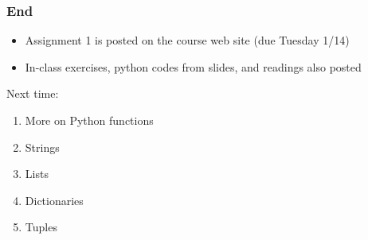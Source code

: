\documentclass{beamer}
\begin{document}
\begin{frame}
\frametitle{End}
\begin{itemize}
\setlength{\itemsep}{0.05in}
\item{Assignment 1 is posted on the course web site (due Tuesday 1/14)}
\item{In-class exercises, python codes from slides, and readings also posted}
\end{itemize}

Next time:
\begin{enumerate}
\setlength{\itemsep}{0.05in}
\item{More on Python functions}
\item{Strings}
\item{Lists}
\item{Dictionaries}
\item{Tuples}
\end{enumerate}

\end{frame}
\end{document}
